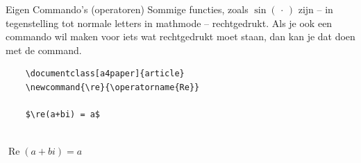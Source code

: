 \begin{frame}[fragile]{Eigen Commando's (operatoren)}
Sommige functies, zoals $\sin(\,\cdot\,)$ zijn -- in tegenstelling tot normale letters in 
mathmode -- rechtgedrukt. Als je ook een commando wil maken voor iets wat rechtgedrukt moet 
staan, dan kan je dat doen met de \texttt{\operatorname{}} command. 
\pause
\begin{verbatim}
    \documentclass[a4paper]{article}
    \newcommand{\re}{\operatorname{Re}}
    
    $\re(a+bi) = a$
    
\end{verbatim}
\pause
\newcommand{\re}{\operatorname{Re}}
\begin{tcolorbox}[boxrule=0.5pt, colback=white]
    $\re(a+bi) = a$
\end{tcolorbox}
\end{frame}